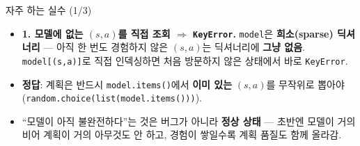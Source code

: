 \begin{frame}{자주 하는 실수 (1/3)}
  \begin{itemize}
    \item \textbf{1. 모델에 없는 $(s,a)$를 직접 조회 $\Rightarrow$
      \texttt{KeyError}.}
      \texttt{model}은 \textbf{희소(sparse) 딕셔너리} --- 아직 한
      번도 경험하지 않은 $(s,a)$는 딕셔너리에 \textbf{그냥
      없음}. \texttt{model[(s,a)]}로 직접 인덱싱하면 처음
      방문하지 않은 상태에서 바로 \texttt{KeyError}.
    \item \textbf{정답}: 계획은 반드시 \texttt{model.items()}에서
      \textbf{이미 있는} $(s,a)$를 무작위로 뽑아야
      (\texttt{random.choice(list(model.items()))}).
    \item ``모델이 아직 불완전하다''는 것은 버그가 아니라
      \textbf{정상 상태} --- 초반엔 모델이 거의 비어 계획이 거의
      아무것도 안 하고, 경험이 쌓일수록 계획 품질도 함께 올라감.
  \end{itemize}
\end{frame}
